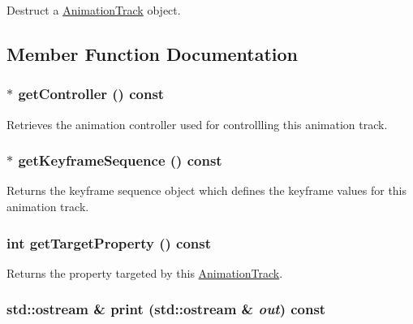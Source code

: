 Destruct a \hyperlink{classm3g_1_1AnimationTrack}{AnimationTrack} object. 

\subsection{Member Function Documentation}
\hypertarget{classm3g_1_1AnimationTrack_3a54e89528127de5b4d0a48a2045a91c}{
\subsubsection[{getController}]{ $\ast$ getController () const}}
\label{classm3g_1_1AnimationTrack_3a54e89528127de5b4d0a48a2045a91c}


Retrieves the animation controller used for controllling this animation track. \hypertarget{classm3g_1_1AnimationTrack_e83c81771a8329e1e5f978f228c0b308}{
\subsubsection[{getKeyframeSequence}]{ $\ast$ getKeyframeSequence () const}}
\label{classm3g_1_1AnimationTrack_e83c81771a8329e1e5f978f228c0b308}


Returns the keyframe sequence object which defines the keyframe values for this animation track. \hypertarget{classm3g_1_1AnimationTrack_143de0bf90b434f1487caae5b0b66bbf}{
\subsubsection[{getTargetProperty}]{\setlength{\rightskip}{0pt plus 5cm}int getTargetProperty () const}}
\label{classm3g_1_1AnimationTrack_143de0bf90b434f1487caae5b0b66bbf}


Returns the property targeted by this \hyperlink{classm3g_1_1AnimationTrack}{AnimationTrack}. \hypertarget{classm3g_1_1AnimationTrack_6fea17fa1532df3794f8cb39cb4f911f}{
\subsubsection[{print}]{\setlength{\rightskip}{0pt plus 5cm}std::ostream \& print (std::ostream \& {\em out}) const}}
\label{classm3g_1_1AnimationTrack_6fea17fa1532df3794f8cb39cb4f911f}


